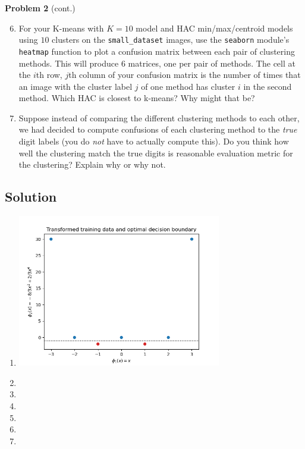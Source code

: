 \documentclass[submit]{harvardml}
\begin{document}
\newpage
\begin{framed}
\noindent\textbf{Problem 2} (cont.)\\
\begin{enumerate}
\setcounter{enumi}{5}
\item For your K-means with $K = 10$ model and HAC min/max/centroid
  models using $10$ clusters on the \texttt{small\_dataset} images,
  use the \texttt{seaborn} module's \texttt{heatmap} function to plot
  a confusion matrix between each pair of clustering methods.  This
  will produce 6 matrices, one per pair of methods. The cell at the
  $i$th row, $j$th column of your confusion matrix is the number of
  times that an image with the cluster label $j$ of one method has
  cluster $i$ in the second method.  Which HAC is closest to k-means?
  Why might that be?

\item Suppose instead of comparing the different clustering methods to
  each other, we had decided to compute confusions of each clustering
  method to the \emph{true} digit labels (you do \emph{not} have to
  actually compute this).  Do you think how well the clustering match
  the true digits is reasonable evaluation metric for the clustering?
  Explain why or why not.
  
\end{enumerate}
\end{framed}


\subsection*{Solution}

\begin{enumerate}
	\item \includegraphics[width=0.7\textwidth]{SVM}
	\item 
	\item 
	\item 
	\item 
	\item
	\item
\end{enumerate}
\end{document}
